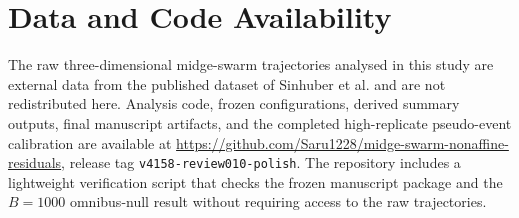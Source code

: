 \section*{Data and Code Availability}

The raw three-dimensional midge-swarm trajectories analysed in this study are
external data from the published dataset of Sinhuber et al.
\cite{sinhuber2019_dataset} and are not redistributed here. Analysis code,
frozen configurations, derived summary outputs, final manuscript artifacts,
and the completed high-replicate pseudo-event calibration are available at
\url{https://github.com/Saru1228/midge-swarm-nonaffine-residuals}, release tag
\texttt{v4158-review010-polish}. The repository includes a lightweight verification
script that checks the frozen manuscript package and the $B=1000$ omnibus-null
result without requiring access to the raw trajectories.
